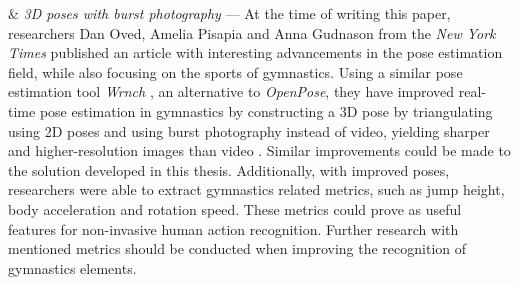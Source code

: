 \begin{easylist}[enumerate]
& \textit{3D poses with burst photography} --- At the time of writing this paper, researchers Dan Oved, Amelia Pisapia and Anna Gudnason from the \textit{New York Times} published an article with interesting advancements in the pose estimation field, while also focusing on the sports of gymnastics. Using a similar pose estimation tool \textit{Wrnch} \cite{wrnchai}, an alternative to \textit{OpenPose}, they have improved real-time pose estimation in gymnastics by constructing a 3D pose by triangulating using 2D poses and using burst photography instead of video, yielding sharper and higher-resolution images than video \cite{nyt-pose-estimation}. Similar improvements could be made to the solution developed in this thesis. Additionally, with improved poses, researchers were able to extract gymnastics related metrics, such as jump height, body acceleration and rotation speed. These metrics could prove as useful features for non-invasive human action recognition. Further research with mentioned metrics should be conducted when improving the recognition of gymnastics elements. 
    
\end{easylist}


